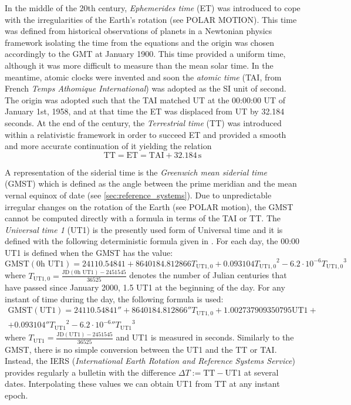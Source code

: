 \documentclass[../main.tex]{subfiles}
\begin{document}
In the middle of the 20th century, \emph{Ephemerides time} (ET) was introduced to cope with the irregularities of the Earth's rotation (see POLAR MOTION). This time was defined from historical observations of planets in a Newtonian physics framework isolating the time from the equations and the origin was chosen accordingly to the GMT at January 1900. This time provided a uniform time, although it was more difficult to measure than the mean solar time. In the meantime, atomic clocks were invented and soon the \emph{atomic time} (TAI, from French \emph{Temps Athomique International}) was adopted as the SI unit of second. The origin was adopted such that the TAI matched UT at the 00:00:00 UT of January 1st, 1958, and at that time the ET was displaced from UT by 32.184 seconds. At the end of the century, the \emph{Terrestrial time} (TT) was introduced within a relativistic framework in order to succeed ET and provided a smooth and more accurate continuation of it yielding the relation
\begin{equation}
  \text{TT}=\text{ET}= \text{TAI} + 32.184\,\mathrm{s}
\end{equation}

A representation of the siderial time is the \emph{Greenwich mean siderial time} (GMST) which is defined as the angle between the prime meridian and the mean vernal equinox of date (see \cref{sec:reference_systems}). Due to unpredictable irregular changes on the rotation of the Earth (see POLAR motion), the GMST cannot be computed directly with a formula in terms of the TAI or TT. The \emph{Universal time 1} (UT1) is the presently used form of Universal time and it is defined with the following deterministic formula given in \cite{aoki}. For each day, the 00:00 UT1 is defined when the GMST has the value:
\begin{equation}
  \mathrm{GMST}(0\text{h UT1})=24110.54841+8640184.812866{T_{\text{UT1},0}}+0.093104{T_{\text{UT1},0}}^2-6.2\cdot 10^{-6}{T_{\text{UT1},0}}^3
\end{equation}
where $T_{\text{UT1},0}=\frac{\text{JD}(0\text{h UT1})-2451545}{36525}$ denotes the number of Julian centuries that have passed since January 2000, 1.5 UT1 at the beginning of the day. For any instant of time during the day, the following formula is used:
\begin{multline}
  \mathrm{GMST}(\mathrm{UT1})=24110.54841''+8640184.812866''{T_{\text{UT1},0}}+1.002737909350795\text{UT1}+\\+0.093104''{T_{\text{UT1}}}^2-{6.2\cdot 10^{-6}}''{T_{\text{UT1}}}^3
\end{multline}
where $T_\text{UT1}=\frac{\text{JD}(\text{UT1})-2451545}{36525}$ and UT1 is measured in seconds. Similarly to the GMST, there is no simple conversion between the UT1 and the TT or TAI. Instead, the IERS (\emph{International Earth Rotation and Reference Systems Service}) provides regularly a bulletin with the difference $\Delta T:= \mathrm{TT}-\mathrm{UT1}$ at several dates. Interpolating these values we can obtain UT1 from TT at any instant epoch.
\end{document}
